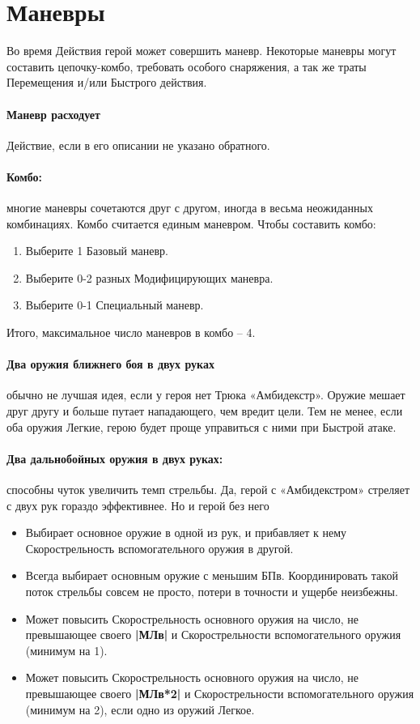 \section{Маневры}
Во время Действия герой может совершить маневр. Некоторые маневры могут составить цепочку-комбо, требовать особого снаряжения, а так же траты Перемещения и/или Быстрого действия.
\paragraph{Маневр расходует} Действие, если в его описании не указано обратного.
\paragraph{Комбо:} многие маневры сочетаются друг с другом, иногда в весьма неожиданных комбинациях. Комбо считается единым маневром.
Чтобы составить комбо:
\begin{enumerate}
  \item Выберите 1 Базовый маневр.
  \item Выберите 0-2 разных Модифицирующих маневра.
  \item Выберите 0-1 Специальный маневр.
\end{enumerate}
Итого, максимальное число маневров в комбо – 4.

\paragraph{Два оружия ближнего боя в двух руках} обычно не лучшая идея, если у героя нет Трюка «Амбидекстр». Оружие мешает друг другу и больше путает нападающего, чем вредит цели. Тем не менее, если оба оружия Легкие, герою будет проще управиться с ними при Быстрой атаке. 

\paragraph{Два дальнобойных оружия в двух руках:} способны чуток увеличить темп стрельбы. Да, герой с «Амбидекстром» стреляет с двух рук гораздо эффективнее. Но и герой без него
\begin{itemize}
  \item Выбирает основное оружие в одной из рук, и прибавляет к нему Скорострельность вспомогательного оружия в другой.
  \item Всегда выбирает основным оружие с меньшим БПв. Координировать такой поток стрельбы совсем не просто, потери в точности и ущербе неизбежны.
  \item Может повысить Скорострельность основного оружия на число, не превышающее своего \textbf{|МЛв|} и Скорострельности вспомогательного оружия (минимум на 1).
  \item Может повысить Скорострельность основного оружия на число, не превышающее своего \textbf{|МЛв*2|} и Скорострельности вспомогательного оружия (минимум на 2), если одно из оружий Легкое.
\end{itemize}


